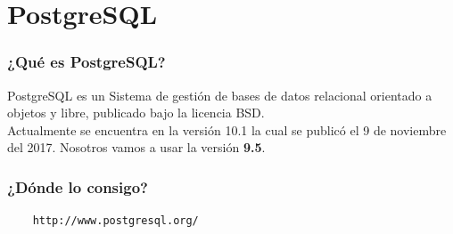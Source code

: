 \documentclass{beamer}
\begin{document}
\section{PostgreSQL}

\begin{frame}
  \frametitle{¿Qué es PostgreSQL?}
  PostgreSQL es un Sistema de gestión de bases de datos relacional orientado a
  objetos y libre, publicado bajo la licencia BSD.\\
  Actualmente se encuentra en la versión 10.1 la cual se publicó el 9
  de noviembre del 2017. Nosotros vamos a usar la versión \textbf{9.5}.
\end{frame}

\begin{frame}[fragile]
  \frametitle{¿Dónde lo consigo?}
  \begin{verbatim}
    http://www.postgresql.org/
  \end{verbatim}
\end{frame}
\end{document}
